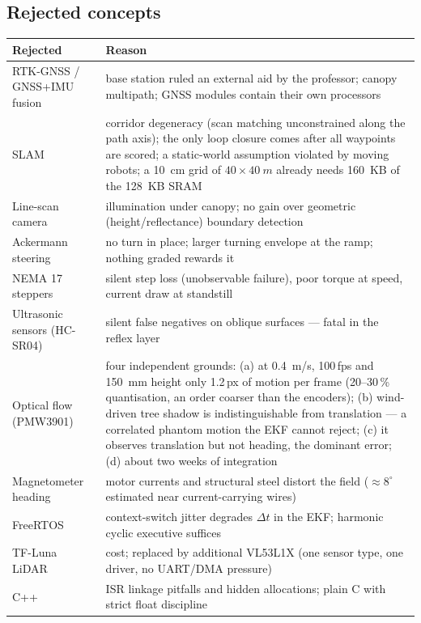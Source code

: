 \documentclass[11pt,a4paper]{article}
\begin{document}
\subsection{Rejected concepts}\label{sec:rejected}

\begin{center}
\small
\begin{tabularx}{\textwidth}{@{}lL@{}}
\toprule
\textbf{Rejected} & \textbf{Reason}\\
\midrule
RTK-GNSS / GNSS+IMU fusion & base station ruled an external aid by the professor; canopy multipath; GNSS modules contain their own processors\\
SLAM & corridor degeneracy (scan matching unconstrained along the path axis); the only loop closure comes after all waypoints are scored; a static-world assumption violated by moving robots; a \qty{10}{cm} grid of $40\times\qty{40}{m}$ already needs \qty{160}{KB} of the \qty{128}{KB} SRAM\\
Line-scan camera & illumination under canopy; no gain over geometric (height/reflectance) boundary detection\\
Ackermann steering & no turn in place; larger turning envelope at the ramp; nothing graded rewards it\\
NEMA 17 steppers & silent step loss (unobservable failure), poor torque at speed, current draw at standstill\\
Ultrasonic sensors (HC-SR04) & silent false negatives on oblique surfaces --- fatal in the reflex layer\\
Optical flow (PMW3901) & four independent grounds: (a) at \qty{0.4}{m/s}, 100\,fps and \qty{150}{mm} height only \num{1.2}\,px of motion per frame (20--30\,\% quantisation, an order coarser than the encoders); (b) wind-driven tree shadow is indistinguishable from translation --- a correlated phantom motion the EKF cannot reject; (c) it observes translation but not heading, the dominant error; (d) about two weeks of integration\\
Magnetometer heading & motor currents and structural steel distort the field ($\approx 8^\circ$ estimated near current-carrying wires)\\
FreeRTOS & context-switch jitter degrades $\Delta t$ in the EKF; harmonic cyclic executive suffices\\
TF-Luna LiDAR & cost; replaced by additional VL53L1X (one sensor type, one driver, no UART/DMA pressure)\\
C++ & ISR linkage pitfalls and hidden allocations; plain C with strict float discipline\\
\bottomrule
\end{tabularx}
\end{center}
\end{document}
